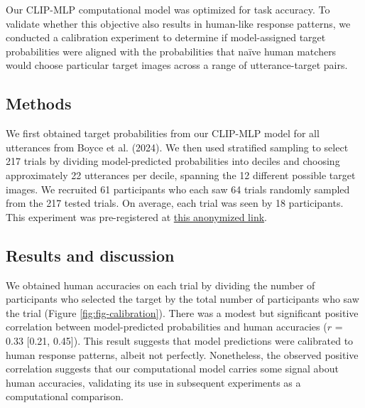 \documentclass[10pt, letterpaper]{article}
\begin{document}
Our CLIP-MLP computational model was optimized for task accuracy. To
validate whether this objective also results in human-like response
patterns, we conducted a calibration experiment to determine if
model-assigned target probabilities were aligned with the probabilities
that naïve human matchers would choose particular target images across a
range of utterance-target pairs.

\subsection{Methods}\label{methods}

We first obtained target probabilities from our CLIP-MLP model for all
utterances from Boyce et al. (2024). We then used stratified sampling to
select 217 trials by dividing model-predicted probabilities into deciles
and choosing approximately 22 utterances per decile, spanning the 12
different possible target images. We recruited 61 participants who each
saw 64 trials randomly sampled from the 217 tested trials. On average,
each trial was seen by 18 participants. This experiment was
pre-registered at
\href{https://osf.io/6pv5e/?view_only=0bc61ddeda83493c844ca554f463ba85}{this
anonymized link}.

\subsection{Results and discussion}\label{results-and-discussion}

We obtained human accuracies on each trial by dividing the number of
participants who selected the target by the total number of participants
who saw the trial (Figure \ref{fig:fig-calibration}). There was a modest
but significant positive correlation between model-predicted
probabilities and human accuracies (\(r\) = 0.33 {[}0.21, 0.45{]}). This
result suggests that model predictions were calibrated to human response
patterns, albeit not perfectly. Nonetheless, the observed positive
correlation suggests that our computational model carries some signal
about human accuracies, validating its use in subsequent experiments as
a computational comparison.
\end{document}
